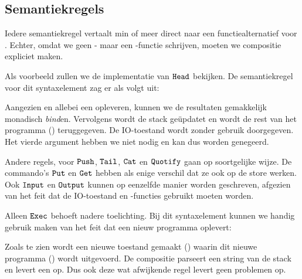 \subsection{Semantiekregels}
\label{sec:cleansmurf:regels}
Iedere semantiekregel vertaalt min of meer direct naar een functiealternatief
voor . Echter, omdat we geen - maar een -functie
schrijven, moeten we compositie expliciet maken.

Als voorbeeld zullen we de implementatie van $\texttt{Head}$ bekijken. De
semantiekregel voor dit syntaxelement zag er als volgt uit:
\therheadns

Aangezien  en  allebei een  opleveren, kunnen we de
resultaten gemakkelijk monadisch \emph{bind}en. Vervolgens wordt de stack
geüpdatet en wordt de rest van het programma () teruggegeven. De
IO-toestand wordt zonder gebruik doorgegeven. Het vierde argument hebben we
niet nodig en kan dus worden genegeerd.



Andere regels, voor $\texttt{Push}$, $\texttt{Tail}$, $\texttt{Cat}$ en $\texttt{Quotify}$ gaan op
soortgelijke wijze. De commando's $\texttt{Put}$ en $\texttt{Get}$ hebben als enige
verschil dat ze ook op de store werken. Ook $\texttt{Input}$ en $\texttt{Output}$ kunnen
op eenzelfde manier worden geschreven, afgezien van het feit dat de IO-toestand
en -functies gebruikt moeten worden.

Alleen $\texttt{Exec}$ behoeft nadere toelichting. Bij dit syntaxelement kunnen we
handig gebruik maken van het feit dat  een nieuw programma oplevert:



Zoals te zien wordt een nieuwe toestand gemaakt () waarin dit nieuwe
programma () wordt uitgevoerd. De compositie 
parseert een string van de stack en levert een  op. Dus ook
deze wat afwijkende regel levert geen problemen op.
